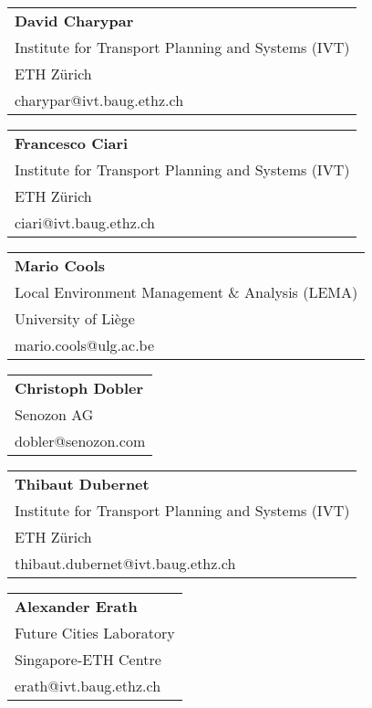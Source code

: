 \begin{tabular}[width=0.48\textwidth]{@{}l}
\textbf{David Charypar} \\
Institute for Transport Planning and Systems (IVT) \\
ETH Zürich \\
charypar@ivt.baug.ethz.ch \\
\end{tabular}

\begin{tabular}[width=0.48\textwidth]{@{}l}
\textbf{Francesco Ciari} \\
Institute for Transport Planning and Systems (IVT) \\
ETH Zürich \\
ciari@ivt.baug.ethz.ch \\
\end{tabular}

\begin{tabular}[width=0.48\textwidth]{@{}l}
\textbf{Mario Cools} \\
Local Environment Management \& Analysis (LEMA) \\
University of Liège \\
mario.cools@ulg.ac.be \\
\end{tabular}

\begin{tabular}[width=0.48\textwidth]{@{}l}
\textbf{Christoph Dobler} \\
Senozon AG \\
dobler@senozon.com \\
\end{tabular}

\begin{tabular}[width=0.48\textwidth]{@{}l}
\textbf{Thibaut Dubernet} \\
Institute for Transport Planning and Systems (IVT) \\
ETH Zürich \\
thibaut.dubernet@ivt.baug.ethz.ch \\
\end{tabular}

\begin{tabular}[width=0.48\textwidth]{@{}l}
\textbf{Alexander Erath} \\
Future Cities Laboratory \\
Singapore-ETH Centre\\
erath@ivt.baug.ethz.ch \\
\end{tabular}

